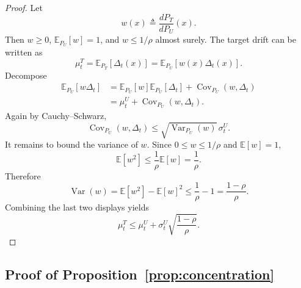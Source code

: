 \documentclass{article}
\newcommand{\EE}{\mathbb{E}}
\begin{document}
\begin{proof}
Let
\begin{equation}
    w(x) \triangleq \frac{dP_T}{dP_U}(x).
\end{equation}
Then $w\ge 0$, $\EE_{P_U}[w]=1$, and $w\le 1/\rho$ almost surely. The target drift can be written as
\begin{equation}
    \mu_t^T
    =
    \EE_{P_T}[\Delta_t(x)]
    =
    \EE_{P_U}[w(x)\Delta_t(x)].
\end{equation}
Decompose
\begin{align}
    \EE_{P_U}[w\Delta_t]
    &=
    \EE_{P_U}[w]\EE_{P_U}[\Delta_t]
    +
    \operatorname{Cov}_{P_U}(w,\Delta_t) \\
    &=
    \mu_t^U + \operatorname{Cov}_{P_U}(w,\Delta_t).
\end{align}
Again by Cauchy--Schwarz,
\begin{equation}
    \operatorname{Cov}_{P_U}(w,\Delta_t)
    \le
    \sqrt{\operatorname{Var}_{P_U}(w)}\, \sigma_t^U.
\end{equation}
It remains to bound the variance of $w$. Since $0\le w\le 1/\rho$ and $\EE[w]=1$,
\begin{equation}
    \EE[w^2]
    \le
    \frac{1}{\rho}\EE[w]
    =
    \frac{1}{\rho}.
\end{equation}
Therefore
\begin{equation}
    \operatorname{Var}(w)
    =
    \EE[w^2]-\EE[w]^2
    \le
    \frac{1}{\rho}-1
    =
    \frac{1-\rho}{\rho}.
\end{equation}
Combining the last two displays yields
\begin{equation}
    \mu_t^T
    \le
    \mu_t^U + \sigma_t^U \sqrt{\frac{1-\rho}{\rho}}.
\end{equation}
\end{proof}

\subsection{Proof of Proposition~\ref{prop:concentration}}
\end{document}
